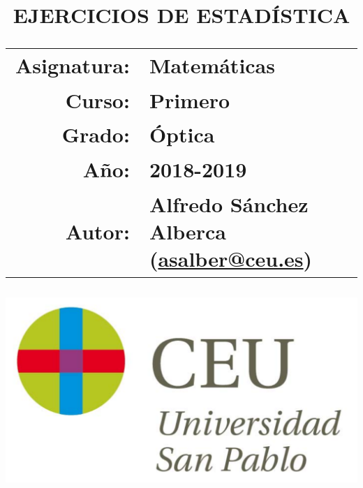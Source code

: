 \documentclass[a4paper,titlepage]{article}
\begin{document}
  \sloppy
  
  
\title{\vskip 2cm
\Huge \textbf{\textsf{\quad \textcolor{blueceu}{EJERCICIOS DE ESTADÍSTICA}\quad}}\\
   \vskip 1cm
\Large \sffamily
\begin{tabular}{rl}
\textcolor{blueceu}{Asignatura:} & Matemáticas\\
\textcolor{blueceu}{Curso:} & Primero\\
\textcolor{blueceu}{Grado:} & Óptica\\
\textcolor{blueceu}{Año:} & 2018-2019\\
\textcolor{blueceu}{Autor:} %
& Alfredo S\'anchez Alberca (\url{asalber@ceu.es})
\end{tabular}
}
  
  \author{}
  \date{\includegraphics[scale=0.3]{img/logo_uspceu}}
  
  \maketitle
  \newpage
  \tableofcontents
  \newpage
  
  
  
  
  
  
  
  
\end{document}
